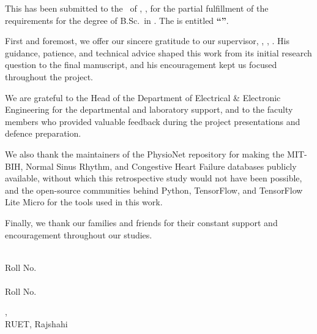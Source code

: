 

\enlargethispage{2\baselineskip}

This \MakeLowercase{\worktype} has been submitted to the \departmentname\ of
\universityname, \universitylocation, for the partial fulfillment of the
requirements for the degree of B.Sc.\ in \degreefield.
The \MakeLowercase{\worktype} is entitled \textbf{``\MakeUppercase{\thesistitle}''}.

First and foremost, we offer our sincere gratitude to our supervisor,
\supervisorname, \supervisordesignation, \supervisordepartment. His
guidance, patience, and technical advice shaped this work from its initial
research question to the final manuscript, and his encouragement kept us
focused throughout the project.

We are grateful to the Head of the Department of Electrical \& Electronic
Engineering for the departmental and laboratory support, and to the faculty
members who provided valuable feedback during the project presentations and
defence preparation.

We also thank the maintainers of the PhysioNet repository for making the
MIT-BIH, Normal Sinus Rhythm, and Congestive Heart Failure databases
publicly available, without which this retrospective study would not have
been possible, and the open-source communities behind Python, TensorFlow,
and TensorFlow Lite Micro for the tools used in this work.

Finally, we thank our families and friends for their constant support and
encouragement throughout our studies.

\vspace{0.4in}

\noindent
\begin{minipage}[t]{0.5\textwidth}
\raggedright
\studentname\\
Roll No. \studentroll\\
\studentnametwo\\
Roll No. \studentrolltwo
\end{minipage}%
\begin{minipage}[t]{0.5\textwidth}
\raggedleft
\submissionmonth, \submissionyear\\
RUET, Rajshahi
\end{minipage}

\clearpage